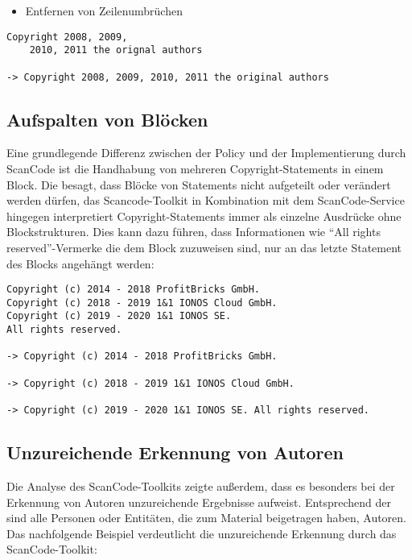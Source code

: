 \begin{itemize}
    \item Entfernen von Zeilenumbrüchen
\end{itemize}
\begin{lstlisting}[keepspaces=true]
Copyright 2008, 2009,
    2010, 2011 the orignal authors

-> Copyright 2008, 2009, 2010, 2011 the original authors
\end{lstlisting}


\subsection{Aufspalten von Blöcken}

Eine grundlegende Differenz zwischen der Policy und der Implementierung durch ScanCode ist die Handhabung von mehreren Copyright-Statements in einem Block.
Die  besagt, dass Blöcke von Statements nicht aufgeteilt oder verändert werden dürfen, das Scancode-Toolkit in Kombination mit dem ScanCode-Service hingegen interpretiert Copyright-Statements immer als einzelne Ausdrücke ohne Blockstrukturen.
Dies kann dazu führen, dass Informationen wie \enquote{All rights reserved}-Vermerke die dem Block zuzuweisen sind, nur an das letzte Statement des Blocks angehängt werden:

\begin{lstlisting}[keepspaces=true]
Copyright (c) 2014 - 2018 ProfitBricks GmbH.
Copyright (c) 2018 - 2019 1&1 IONOS Cloud GmbH.
Copyright (c) 2019 - 2020 1&1 IONOS SE.
All rights reserved.

-> Copyright (c) 2014 - 2018 ProfitBricks GmbH.

-> Copyright (c) 2018 - 2019 1&1 IONOS Cloud GmbH.

-> Copyright (c) 2019 - 2020 1&1 IONOS SE. All rights reserved.
\end{lstlisting}


\subsection{Unzureichende Erkennung von Autoren}

Die Analyse des ScanCode-Toolkits zeigte außerdem, dass es besonders bei der Erkennung von Autoren unzureichende Ergebnisse aufweist.
Entsprechend der  sind alle Personen oder Entitäten, die zum Material beigetragen haben, Autoren.
Das nachfolgende Beispiel verdeutlicht die unzureichende Erkennung durch das ScanCode-Toolkit:

